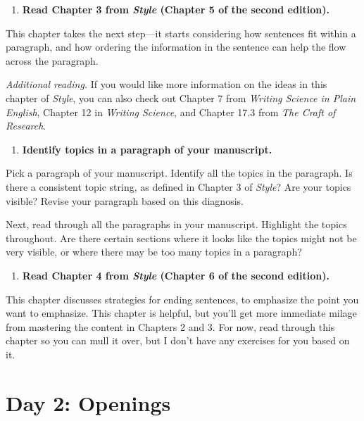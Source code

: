 \documentclass[]{tufte-book}
\providecommand{\tightlist}{%
  \setlength{\itemsep}{0pt}\setlength{\parskip}{0pt}}
\begin{document}
\begin{enumerate}
\def\labelenumi{\arabic{enumi}.}
\setcounter{enumi}{7}
\tightlist
\item
  \textbf{Read Chapter 3 from \emph{Style} (Chapter 5 of the second edition).}
\end{enumerate}

This chapter takes the next step---it starts considering how sentences fit
within a paragraph, and how ordering the information in the sentence can
help the flow across the paragraph.

\emph{Additional reading.} If you would like more information on the ideas in this
chapter of \emph{Style}, you can also check out Chapter 7 from \emph{Writing Science in
Plain English}, Chapter 12 in \emph{Writing Science}, and Chapter 17.3 from
\emph{The Craft of Research}.

\begin{enumerate}
\def\labelenumi{\arabic{enumi}.}
\setcounter{enumi}{8}
\tightlist
\item
  \textbf{Identify topics in a paragraph of your manuscript.}
\end{enumerate}

Pick a paragraph of your manuscript. Identify all the topics in the paragraph.
Is there a consistent topic string, as defined in Chapter 3 of \emph{Style}?
Are your topics visible? Revise your paragraph based on this diagnosis.

Next, read through all the paragraphs in your manuscript. Highlight the topics
throughout. Are there certain sections where it looks like the topics might not
be very visible, or where there may be too many topics in a paragraph?

\begin{enumerate}
\def\labelenumi{\arabic{enumi}.}
\setcounter{enumi}{9}
\tightlist
\item
  \textbf{Read Chapter 4 from \emph{Style} (Chapter 6 of the second edition).}
\end{enumerate}

This chapter discusses strategies for ending sentences, to emphasize the point
you want to emphasize. This chapter is helpful, but you'll get more immediate
milage from mastering the content in Chapters 2 and 3. For now, read through
this chapter so you can mull it over, but I don't have any exercises for you
based on it.

\hypertarget{day-2-openings}{%
\chapter{Day 2: Openings}\label{day-2-openings}}
\end{document}
